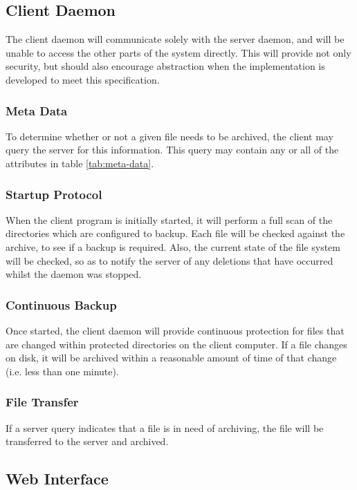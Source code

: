 \subsection{Client Daemon}

The client daemon will communicate solely with the server daemon, and will be
unable to access the other parts of the system directly. This will provide not
only security, but should also encourage abstraction when the implementation is
developed to meet this specification.

\subsubsection{Meta Data}

To determine whether or not a given file needs to be archived, the client may
query the server for this information. This query may contain any or all of the
attributes in table \ref{tab:meta-data}.

\subsubsection{Startup Protocol}

When the client program is initially started, it will perform a full scan of
the directories which are configured to backup. Each file will be checked
against the archive, to see if a backup is required. Also, the current state of
the file system will be checked, so as to notify the server of any deletions
that have occurred whilst the daemon was stopped.

\subsubsection{Continuous Backup}

Once started, the client daemon will provide continuous protection for files
that are changed within protected directories on the client computer. If a file
changes on disk, it will be archived within a reasonable amount of time of that
change (i.e. less than one minute).

\subsubsection{File Transfer}

If a server query indicates that a file is in need of archiving, the file
will be transferred to the server and archived.

\subsection{Web Interface}

